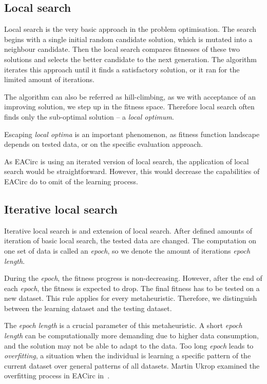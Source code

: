 \documentclass[
  print, %
  Table,   %
  nolof,     %
  nolot,     %
  11pt, %
  oneside  %
]{fithesis3}
\begin{document}
\subsection{Local search}
\label{subsec:opt-single-sol-ls}

Local search is the very basic approach in the problem optimisation. The search begins with a single initial random candidate solution, which is mutated into a neighbour candidate. Then the local search compares fitnesses of these two solutions and selects the better candidate to the next generation. The algorithm iterates this approach until it finds a satisfactory solution, or it ran for the limited amount of iterations.

The algorithm can also be referred as hill-climbing, as we with acceptance of an improving solution, we step up in the fitness space. Therefore local search often finds only the sub-optimal solution -- a \textit{local optimum}.

Escaping \textit{local optima} is an important phenomenon, as fitness function landscape depends on tested data, or on the specific evaluation approach.

As EACirc is using an iterated version of local search, the application of local search would be straightforward. However, this would decrease the capabilities of EACirc do to omit of the learning process.

\subsection{Iterative local search}
\label{subsec:opt-single-sol-ils}

Iterative local search is and extension of local search. After defined amounts of iteration of basic local search, the tested data are changed. The computation on one set of data is called an \textit{epoch}, so we denote the amount of iterations \textit{epoch length}.

During the \textit{epoch}, the fitness progress is non-decreasing. However, after the end of each \textit{epoch}, the fitness is expected to drop. The final fitness has to be tested on a new dataset. This rule applies for every metaheuristic. Therefore, we distinguish between the learning dataset and the testing dataset.

The \textit{epoch length} is a crucial parameter of this metaheuristic. A short \textit{epoch length} can be computationally more demanding due to higher data consumption, and the solution may not be able to adapt to the data. Too long \textit{epoch} leads to \textit{overfitting}, a situation when the individual is learning a specific pattern of the current dataset over general patterns of all datasets. Martin Ukrop examined the overfitting process in EACirc in~\cite[Chapter~7]{ukropBcThesis}.
\end{document}
